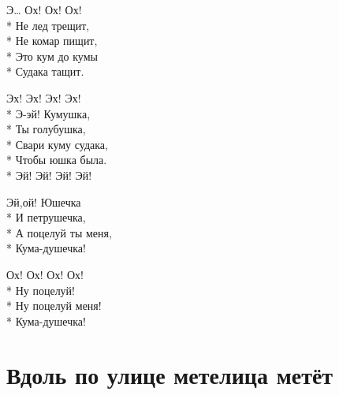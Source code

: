 \medskip

\begin{minipage}{\linewidth}
Э… Ох! Ох! Ох!\\*
Не лед трещит,\\*
Не комар пищит,\\*
Это кум до кумы\\*
Судака тащит.\\
\end{minipage}\par\medskip\nobreak

\medskip

\begin{minipage}{\linewidth}
Эх! Эх! Эх! Эх!\\*
Э-эй! Кумушка,\\*
Ты голубушка,\\*
Свари куму судака,\\*
Чтобы юшка была.\\*
Эй! Эй! Эй! Эй!\\
\end{minipage}\par\medskip\nobreak

\medskip

\begin{minipage}{\linewidth}
Эй,ой! Юшечка\\*
И петрушечка,\\*
А поцелуй ты меня,\\*
Кума-душечка!\\
\end{minipage}\par\medskip\nobreak

\medskip

\begin{minipage}{\linewidth}
Ох! Ох! Ох! Ох!\\*
Ну поцелуй!\\*
Ну поцелуй меня!\\*
Кума-душечка!\\
\end{minipage}

\vspace{\fill}\newpage

\section{Вдоль по улице метелица метёт}
\label{song:Вдоль_по_улице_метелица_метёт}

